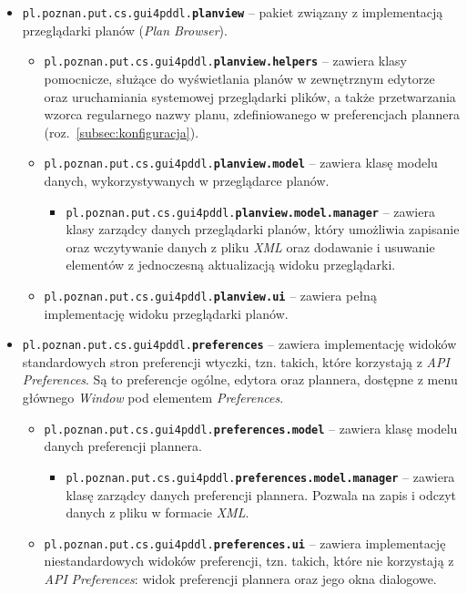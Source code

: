 \begin{itemize}
\item \texttt{pl.poznan.put.cs.gui4pddl.\textbf{planview}} -- pakiet związany z implementacją przeglądarki planów (\textit{Plan Browser}).
\begin{itemize}
\item \texttt{pl.poznan.put.cs.gui4pddl.\textbf{planview.helpers}} -- zawiera klasy pomocnicze, służące do wyświetlania planów w zewnętrznym edytorze oraz uruchamiania systemowej przeglądarki plików, a także przetwarzania wzorca regularnego nazwy planu, zdefiniowanego w preferencjach plannera (roz.~\ref{subsec:konfiguracja}).
\item \texttt{pl.poznan.put.cs.gui4pddl.\textbf{planview.model}} -- zawiera klasę modelu danych, wykorzystywanych w przeglądarce planów.
\begin{itemize}
\item \texttt{pl.poznan.put.cs.gui4pddl.\textbf{planview.model.manager}} -- zawiera klasy zarządcy danych przeglądarki planów, który umożliwia zapisanie oraz wczytywanie danych z pliku \textit{XML} oraz dodawanie i usuwanie elementów z jednoczesną aktualizacją widoku przeglądarki.
\end{itemize}
\item \texttt{pl.poznan.put.cs.gui4pddl.\textbf{planview.ui}} -- zawiera pełną implementację widoku przeglądarki planów.
\end{itemize}
\item \texttt{pl.poznan.put.cs.gui4pddl.\textbf{preferences}} -- zawiera implementację widoków standardowych stron preferencji wtyczki, tzn. takich, które korzystają z \textit{API Preferences}. Są to preferencje ogólne, edytora oraz plannera, dostępne z menu głównego \textit{Window} pod elementem \textit{Preferences}.
\begin{itemize}
\item \texttt{pl.poznan.put.cs.gui4pddl.\textbf{preferences.model}} -- zawiera klasę modelu danych preferencji plannera.
\begin{itemize}
\item \texttt{pl.poznan.put.cs.gui4pddl.\textbf{preferences.model.manager}} -- zawiera klasę zarządcy danych preferencji plannera. Pozwala na zapis i odczyt danych z pliku w formacie \textit{XML}.
\end{itemize}
\item \texttt{pl.poznan.put.cs.gui4pddl.\textbf{preferences.ui}} -- zawiera implementację niestandardowych widoków preferencji, tzn. takich, które nie korzystają z \textit{API} \textit{Preferences}: widok preferencji plannera oraz jego okna dialogowe.

\end{itemize}
\end{itemize}
